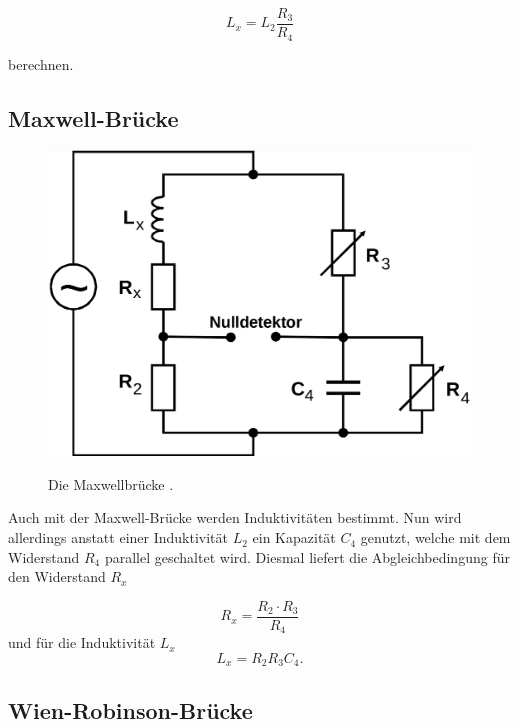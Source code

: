 \begin{equation}
    L_x = L_2 \frac{R_3}{R_4}
\end{equation}

berechnen.

\subsection{Maxwell-Brücke}

\begin{figure}
    \centering
    \includegraphics[scale=0.25]{content/Maxwellbruecke.png}
    \label{fig:maxwell}
    \caption{Die Maxwellbrücke \cite[S. 222]{anleitung}.}
\end{figure}

Auch mit der Maxwell-Brücke werden Induktivitäten bestimmt. 
Nun wird allerdings anstatt einer Induktivität $L_2$ ein Kapazität $C_4$ genutzt,
welche mit dem Widerstand $R_4$ parallel geschaltet wird. 
Diesmal liefert die Abgleichbedingung für den Widerstand $R_x$

\begin{equation}
    R_x = \frac{R_2 \cdot R_3}{R_4}
\end{equation}
und für die Induktivität $L_x$
\begin{equation}
    L_x = R_2 R_3 C_4 .
\end{equation}

\subsection{Wien-Robinson-Brücke}

